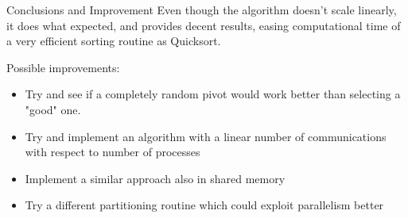 \documentclass[11pt]{beamer}
\begin{document}
\begin{frame}{Conclusions and Improvement}
	Even though the algorithm doesn't scale linearly, it does what expected, and provides decent results, easing computational time of a very efficient sorting routine as Quicksort.
	
	Possible improvements:
	\begin{itemize}
		\item Try and see if a completely random pivot would work better than selecting a "good" one.
		\item Try and implement an algorithm with a linear number of communications with respect to number of processes
		\item Implement a similar approach also in shared memory
		\item Try a different partitioning routine which could exploit parallelism better
	\end{itemize}
\end{frame}
\end{document}

